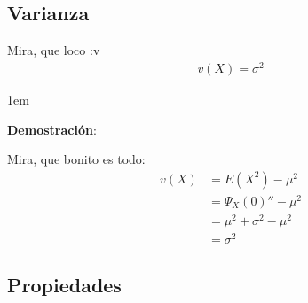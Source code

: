 \documentclass[12pt, fleqn]{report}                             %
\newenvironment{SmallIndentation}[1][0.75em]                    %
        {\begin{adjustwidth}{#1}{}\begin{footnotesize}}             %
        {\end{footnotesize}\end{adjustwidth}}                       %
\theoremstyle{break}                                            %
\begin{document}
                    
            \vspace{1em}
            \subsection{Varianza}

                Mira, que loco :v
                \begin{align*}
                    v(X) = \sigma^2
                \end{align*}

                \begin{SmallIndentation}[1em]
                    \textbf{Demostración}:
                    
                    Mira, que bonito es todo:
                    \begin{align*}
                        v(X)
                            &= E(X^2) - \mu^2                                       \\
                            &= \Psi_X(0)'' - \mu^2                                  \\
                            &= \mu^2 + \sigma^2 - \mu^2                             \\
                            &= \sigma^2
                    \end{align*}
                
                \end{SmallIndentation}


            \clearpage
            \subsection{Propiedades}
\end{document}
